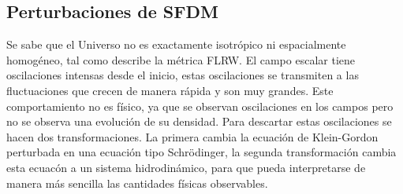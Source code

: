 \documentclass[a4paper,openright,12pt]{book}
\begin{document}
\subsection{Perturbaciones de SFDM}
Se sabe que el Universo no es exactamente isotrópico ni espacialmente homogéneo, tal como describe la métrica FLRW. El campo escalar tiene oscilaciones intensas desde el inicio, estas oscilaciones se transmiten a las fluctuaciones que crecen de manera rápida y son muy grandes. Este comportamiento no es físico, ya que se observan oscilaciones en los campos pero no se observa una evolución de su densidad. Para descartar estas oscilaciones se hacen dos transformaciones. La primera cambia la ecuación de Klein-Gordon perturbada en una ecuación tipo Schrödinger, la segunda transformación cambia esta ecuacón a un sistema hidrodinámico, para que pueda interpretarse de manera más sencilla las cantidades físicas observables.
\end{document}
